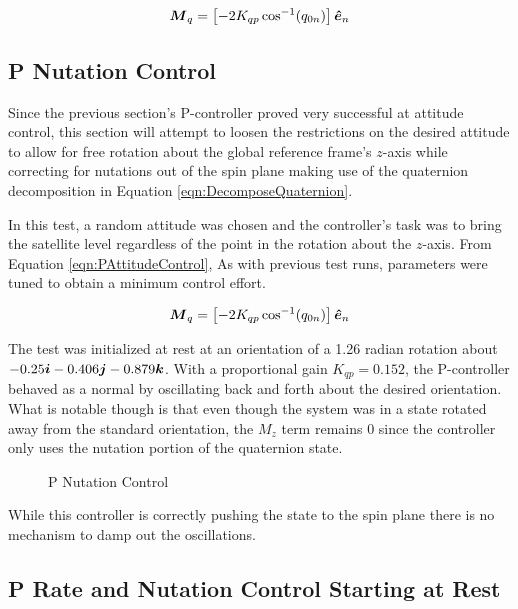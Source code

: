 \begin{equation}
  \boldsymbol{M}_{q} = \left[-2 K_{qp} \cos^{-1} (q_{0n}) \right] \boldsymbol{\hat{e}}_n
  \label{eqn:PNutationControl}
\end{equation}


\subsection{P Nutation Control}
\label{subsec:PNutationControl}

Since the previous section's P-controller proved very successful at attitude control, this section will attempt to loosen the restrictions on the desired attitude to allow for free rotation about the global reference frame's $z$-axis while correcting for nutations out of the spin plane making use of the quaternion decomposition in Equation \ref{eqn:DecomposeQuaternion}.

In this test, a random attitude was chosen and the controller's task was to bring the satellite level regardless of the point in the rotation about the $z$-axis.  From Equation \ref{eqn:PAttitudeControl},    As with previous test runs, parameters were tuned to obtain a minimum control effort.

\begin{equation}
  \boldsymbol{M}_{q} = \left[-2 K_{qp} \cos^{-1} (q_{0n}) \right] \boldsymbol{\hat{e}}_n
  \label{eqn:PNutationControl}
\end{equation}


The test was initialized at rest at an orientation of a 1.26 radian rotation about $-0.25 \boldsymbol{i} -0.406\boldsymbol{j} -0.879\boldsymbol{k}$.  With a proportional gain $K_{qp} = 0.152$, the P-controller behaved as a normal by oscillating back and forth about the desired orientation.  What is notable though is that even though the system was in a state rotated away from the standard orientation, the $M_z$ term remains 0 since the controller only uses the nutation portion of the quaternion state.

\begin{figure}[H]
  \centerline{}
  \caption{P Nutation Control}
  \label{fig:PNutationControl}
\end{figure}

While this controller is correctly pushing the state to the spin plane there is no mechanism to damp out the oscillations.

\subsection{P Rate and Nutation Control Starting at Rest}
\label{subsec:PRateNutationControlStartingatRest}

